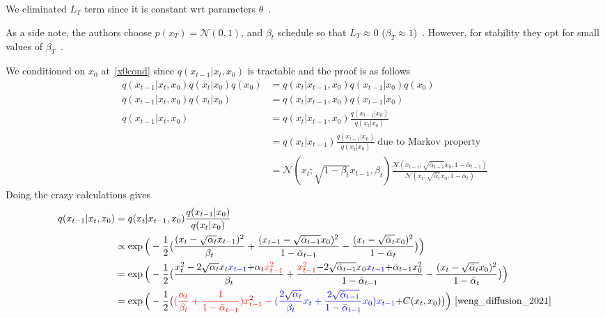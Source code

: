 \documentclass{book}
\numberwithin{equation}{subsection}
\begin{document}
We eliminated $L_T$ term since it is constant wrt parameters $\theta$~\cite{weng_diffusion_2021}.

As a side note, the authors choose $p(x_T)=\mathcal{N}(0,1)$, and $\beta_t$ schedule so that $L_T \approx 0$ ($\beta_T \approx 1$)~\cite{ho_denoising_2020}. However, for stability they opt for small values of $\beta_T$~\cite{sohl-dickstein_deep_2015, ho_denoising_2020}.

We conditioned on $x_0$ at~\ref{x0cond} since $q(x_{t-1}|x_t, x_0)$ is tractable and the proof is as follows
\begin{align}
    q(x_{t-1}|x_t, x_0)q(x_t|x_0)q(x_0) &= q(x_t|x_{t-1}, x_0)q(x_{t-1}|x_0)q(x_0)\\
    q(x_{t-1}|x_t, x_0)q(x_t|x_0) &= q(x_t|x_{t-1}, x_0)q(x_{t-1}|x_0)\\
    q(x_{t-1}|x_t, x_0) &= q(x_t|x_{t-1}, x_0)\frac{q(x_{t-1}|x_0)}{q(x_t|x_0)}\\
    &= q(x_t|x_{t-1})\frac{q(x_{t-1}|x_0)}{q(x_t|x_0)}\ \text{due to Markov property} \label{x0cond_re}\\
    &= \mathcal{N}(x_t; \sqrt{1-\beta_t}x_{t-1}, \beta_t)\frac{\mathcal{N}(x_{t-1};\sqrt{\bar{\alpha}_{t-1}}x_0,1 - \bar{\alpha}_{t-1})}{\mathcal{N}(x_t;\sqrt{\bar{\alpha}_t}x_0,1 - \bar{\alpha}_t)}
\end{align}
Doing the crazy calculations gives
\begin{align}
q(x_{t-1}|x_t, x_0)
&= q(x_t|x_{t-1}, x_0) \frac{ q(x_{t-1}|x_0) }{ q(x_t|x_0) }\\
&\propto \exp \Big(-\frac{1}{2} \big(\frac{(x_t - \sqrt{\alpha_t} x_{t-1})^2}{\beta_t} + \frac{(x_{t-1} - \sqrt{\bar{\alpha}_{t-1}} x_0)^2}{1-\bar{\alpha}_{t-1}} - \frac{(x_t - \sqrt{\bar{\alpha}_t} x_0)^2}{1-\bar{\alpha}_t} \big)\Big) \\
&= \exp \Big(-\frac{1}{2} \big(\frac{x_t^2 - 2\sqrt{\alpha_t} x_t \color{blue}{x_{t-1}} \color{black}{+ \alpha_t} \color{red}{x_{t-1}^2} }{\beta_t} + \frac{ \color{red}{x_{t-1}^2} \color{black}{- 2 \sqrt{\bar{\alpha}_{t-1}} x_0} \color{blue}{x_{t-1}} \color{black}{+ \bar{\alpha}_{t-1} x_0^2}  }{1-\bar{\alpha}_{t-1}} - \frac{(x_t - \sqrt{\bar{\alpha}_t} x_0)^2}{1-\bar{\alpha}_t} \big)\Big) \\
&= \exp\Big( -\frac{1}{2} \big( \color{red}{(\frac{\alpha_t}{\beta_t} + \frac{1}{1 - \bar{\alpha}_{t-1}})} x_{t-1}^2 - \color{blue}{(\frac{2\sqrt{\alpha_t}}{\beta_t} x_t + \frac{2\sqrt{\bar{\alpha}_{t-1}}}{1 - \bar{\alpha}_{t-1}} x_0)} x_{t-1} \color{black}{ + C(x_t, x_0) \big)\Big)}~\cite{weng_diffusion_2021}
\end{align}
\end{document}
